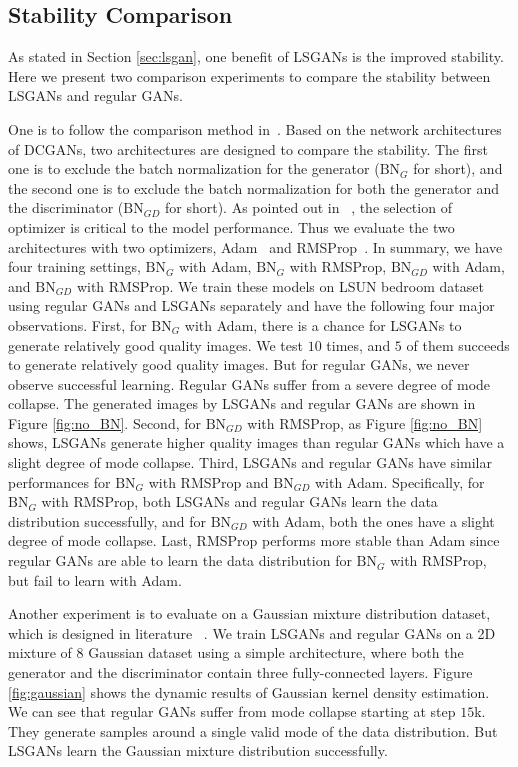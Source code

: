 \documentclass{article} %
\begin{document}
\subsection{Stability Comparison}
As stated in Section \ref{sec:lsgan}, one benefit of LSGANs is the improved stability. Here we present two comparison experiments to compare the stability between LSGANs and regular GANs. 

One is to follow the comparison method in~\cite{Arjovsky2017}. Based on the network architectures of DCGANs, two architectures are designed to compare the stability. The first one is to exclude the batch normalization for the generator ($\text{BN}_G$ for short), and the second one is to exclude the batch normalization for both the generator and the discriminator ($\text{BN}_{GD}$ for short). As pointed out in ~\cite{Arjovsky2017}, the selection of optimizer is critical to the model performance. Thus we evaluate the two architectures with two optimizers, Adam~\cite{Kingma2014} and RMSProp~\cite{Tieleman2012}. In summary, we have four training settings, $\text{BN}_G$ with Adam, $\text{BN}_G$ with RMSProp, $\text{BN}_{GD}$ with Adam, and $\text{BN}_{GD}$ with RMSProp. We train these models on LSUN bedroom dataset using regular GANs and LSGANs separately and have the following four major observations. First, for $\text{BN}_G$ with Adam, there is a chance for LSGANs to generate relatively good quality images. We test $10$ times, and $5$ of them succeeds to generate relatively good quality images. But for regular GANs, we never observe successful learning. Regular GANs suffer from a severe degree of mode collapse. The generated images by LSGANs and regular GANs are shown in Figure \ref{fig:no_BN}. Second, for $\text{BN}_{GD}$ with RMSProp, as Figure \ref{fig:no_BN} shows, LSGANs generate higher quality images than regular GANs which have a slight degree of mode collapse. Third, LSGANs and regular GANs have similar performances for $\text{BN}_G$ with RMSProp and $\text{BN}_{GD}$ with Adam. Specifically, for $\text{BN}_G$ with RMSProp, both LSGANs and regular GANs learn the data distribution successfully, and for $\text{BN}_{GD}$ with Adam, both the ones have a slight degree of mode collapse. Last, RMSProp performs more stable than Adam since regular GANs are able to learn the data distribution for $\text{BN}_G$ with RMSProp, but fail to learn with Adam.

Another experiment is to evaluate on a Gaussian mixture distribution dataset, which is designed in literature ~\cite{Metz2016}. We train LSGANs and regular GANs on a 2D mixture of $8$ Gaussian dataset using a simple architecture, where both the generator and the discriminator contain three fully-connected layers. Figure \ref{fig:gaussian} shows the dynamic results of Gaussian kernel density estimation. We can see that regular GANs suffer from mode collapse starting at step $15$k. They generate samples around a single valid mode of the data distribution. But LSGANs learn the Gaussian mixture distribution successfully. 
\end{document}
